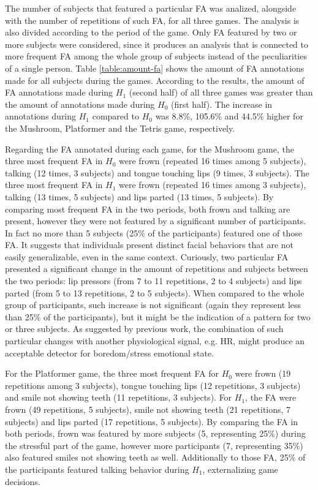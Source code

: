 The number of subjects that featured a particular FA was analized, alongside with the number of repetitions of such FA, for all three games. The analysis is also divided according to the period of the game. Only FA featured by two or more subjects were considered, since it produces an analysis that is connected to more frequent FA among the whole group of subjects instead of the peculiarities of a single person. Table \ref{table:amount-fa} shows the amount of FA annotations made for all subjects during the games. According to the results, the amount of FA annotations made during $H_1$ (second half) of all three games was greater than the amount of annotations made during $H_0$ (first half). The increase in annotations during $H_1$ compared to $H_0$ was 8.8\%, 105.6\% and 44.5\% higher for the Mushroom, Platformer and the Tetris game, respectively.

Regarding the FA annotated during each game, for the Mushroom game, the three most frequent FA in $H_0$ were frown (repeated 16 times among 5 subjects), talking (12 times, 3 subjects) and tongue touching lips (9 times, 3 subjects). The three most frequent FA in $H_1$ were frown (repeated 16 times among 3 subjects), talking (13 times, 5 subjects) and lips parted (13 times, 5 subjects). By comparing most frequent FA in the two periods, both frown and talking are present, however they were not featured by a significant number of participants. In fact no more than 5 subjects (25\% of the participants) featured one of those FA. It suggests that individuals present distinct facial behaviors that are not easily generalizable, even in the same context. Curiously, two particular FA presented a significant change in the amount of repetitions and subjects between the two periods: lip pressors (from 7 to 11 repetitions, 2 to 4 subjects) and lips parted (from 5 to 13 repetitions, 2 to 5 subjects). When compared to the whole group of participants, such increase is not significant (again they represent less than 25\% of the participants), but it might be the indication of a pattern for two or three subjects. As suggested by previous work, the combination of such particular changes with another physiological signal, e.g. HR, might produce an acceptable detector for boredom/stress emotional state.

For the Platformer game, the three most frequent FA for $H_0$ were frown (19 repetitions among 3 subjects), tongue touching lips (12 repetitions, 3 subjects) and smile not showing teeth (11 repetitions, 3 subjects). For $H_1$, the FA were frown (49 repetitions, 5 subjects), smile not showing teeth (21 repetitions, 7 subjects) and lips parted (17 repetitions, 5 subjects). By comparing the FA in both periods, frown was featured by more subjects (5, representing 25\%) during the stressful part of the game, however more participants (7, representing 35\%) also featured smiles not showing teeth as well. Additionally to those FA, 25\% of the participants featured talking behavior during $H_1$, externalizing game decisions.

